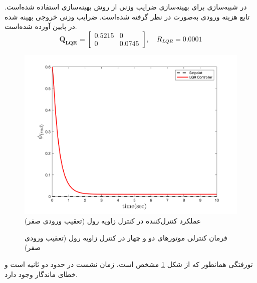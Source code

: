  
 
  در شبیه‌سازی برای بهینه‌سازی ضرایب وزنی  از روش بهینه‌سازی
 \cite{Karimi2010}
استفاده شده‌است.
تابع هزینه ورودی  به‌صورت
در نظر گرفته شده‌است. ضرایب وزنی خروجی بهینه شده در پایین آورده شده‌است.
\begin{equation}
	\boldsymbol{Q_{LQR}} = \begin{bmatrix}
		0.5215 & 0\\
		0 & 0.0745
	\end{bmatrix}, \quad R_{LQR} =  0.0001
\end{equation} 
\begin{figure}[H]
	\includegraphics[width=.48\linewidth]{../Figures/MIL/LQR/Roll/lqr_roll_nn.png}
	\centering
	\caption{عملكرد کنترل‌کننده  در کنترل زاويه رول (تعقیب ورودی صفر)}
	\label{lqr_roll_figure_simulation}
\end{figure}
\begin{figure}[H]
	\centering
	\caption{‫‪فرمان کنترلی موتورهای دو و چهار در کنترل زاویه رول (تعقیب ورودی صفر)}
\end{figure}
‌تورفتگی همانطور که از شکل
\ref{lqr_roll_figure_simulation}
مشخص است، زمان نشست در حدود دو ثانیه است و خطای ماندگار وجود دارد.